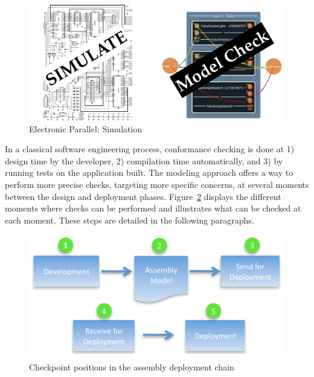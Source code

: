\begin{figure}[h!]
	\includegraphics[width=\textwidth]{part2/pics/ModelCheck.pdf}
	\caption{Electronic Parallel: Simulation}
  	\label{fig:elecSimulation}
\end{figure}

In a classical software engineering process, conformance checking is done at 1) design time by the developer, 2) compilation time automatically, and 3) by running tests on the application built. The modeling approach offers a way to perform more precise checks, targeting more specific concerns, at several moments between the design and deployment phases. Figure~\ref{fig:checkPoints} displays the different moments where checks can be performed and illustrates what can be checked at each moment. These steps are detailed in the following paragraphs.
\begin{figure}
\centering
\includegraphics[width=.8\textwidth]{part2/pics/CheckPositions.pdf}
\caption{Checkpoint positions in the assembly deployment chain}
\label{fig:checkPoints}
\end{figure}



